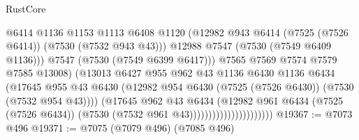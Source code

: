 \begin{lexlean}{RustCore}
\begin{coremodule}
                                            @6414
                                            @1136
                                            @1153
                                            @1113
                                            @6408
                                            @1120
                                            (@12982
                                              @943
                                              @6414
                                              (@7525 (@7526 @6414))
                                              (@7530 (@7532 @943 @43)))
                                            @12988
                                            @7547
                                            (@7530 (@7549 @6409 @1136)))
                                          @7547
                                          (@7530 (@7549 @6399 @6417)))
                                        @7565
                                        @7569
                                        @7574
                                        @7579
                                        @7585
                                        @13008)
                                      (@13013
                                        @6427
                                        @955
                                        @962
                                        @43
                                        @1136
                                        @6430
                                        @1136
                                        @6434
                                        (@17645
                                          @955
                                          @43
                                          @6430
                                          (@12982
                                            @954
                                            @6430
                                            (@7525 (@7526 @6430))
                                            (@7530 (@7532 @954 @43))))
                                        (@17645
                                          @962
                                          @43
                                          @6434
                                          (@12982
                                            @961
                                            @6434
                                            (@7525 (@7526 @6434))
                                            (@7530 (@7532 @961 @43))))))))))))))))))))))
@19367 := @7073 @496
@19371 := @7075 (@7079 @496) (@7085 @496)

\end{coremodule}
\end{lexlean}
